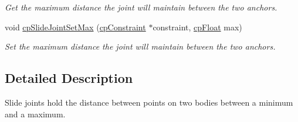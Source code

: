 \begin{DoxyCompactItemize}
\begin{DoxyCompactList}\small\item\em Get the maximum distance the joint will maintain between the two anchors. \end{DoxyCompactList}\item 
\hypertarget{group__cp_slide_joint_gad5f5e53fa62d0d417593a7ec1b7003bb}{}void \hyperlink{group__cp_slide_joint_gad5f5e53fa62d0d417593a7ec1b7003bb}{cp\+Slide\+Joint\+Set\+Max} (\hyperlink{structcp_constraint}{cp\+Constraint} $\ast$constraint, \hyperlink{group__basic_types_gac1ed65573e035bf892505768c852d8d3}{cp\+Float} max)\label{group__cp_slide_joint_gad5f5e53fa62d0d417593a7ec1b7003bb}

\begin{DoxyCompactList}\small\item\em Set the maximum distance the joint will maintain between the two anchors. \end{DoxyCompactList}\end{DoxyCompactItemize}


\subsection{Detailed Description}
Slide joints hold the distance between points on two bodies between a minimum and a maximum. 


